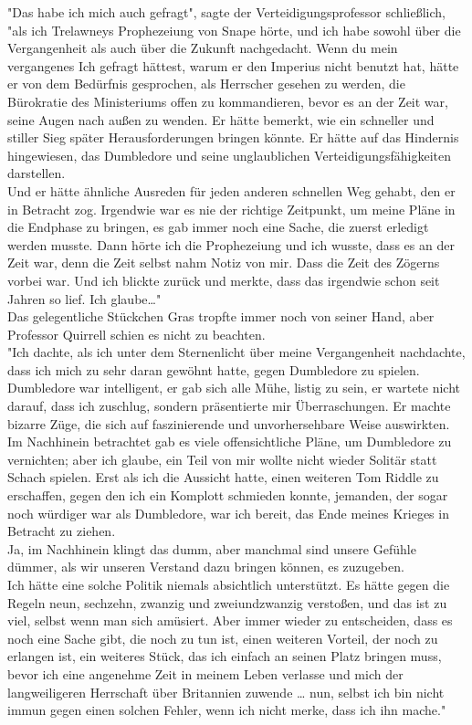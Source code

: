 {"Das habe ich mich auch gefragt", sagte der Verteidigungsprofessor schließlich, "als ich Trelawneys Prophezeiung von Snape hörte, und ich habe sowohl über die Vergangenheit als auch über die Zukunft nachgedacht. Wenn du mein vergangenes Ich gefragt hättest, warum er den Imperius nicht benutzt hat, hätte er von dem Bedürfnis gesprochen, als Herrscher gesehen zu werden, die Bürokratie des Ministeriums offen zu kommandieren, bevor es an der Zeit war, seine Augen nach außen zu wenden. Er hätte bemerkt, wie ein schneller und stiller Sieg später Herausforderungen bringen könnte. Er hätte auf das Hindernis hingewiesen, das Dumbledore und seine unglaublichen Verteidigungsfähigkeiten darstellen.\\ Und er hätte ähnliche Ausreden für jeden anderen schnellen Weg gehabt, den er in Betracht zog. Irgendwie war es nie der richtige Zeitpunkt, um meine Pläne in die Endphase zu bringen, es gab immer noch eine Sache, die zuerst erledigt werden musste. Dann hörte ich die Prophezeiung und ich wusste, dass es an der Zeit war, denn die Zeit selbst nahm Notiz von mir. Dass die Zeit des Zögerns vorbei war. Und ich blickte zurück und merkte, dass das irgendwie schon seit Jahren so lief. Ich glaube…"\\ Das gelegentliche Stückchen Gras tropfte immer noch von seiner Hand, aber Professor Quirrell schien es nicht zu beachten.\\ "Ich dachte, als ich unter dem Sternenlicht über meine Vergangenheit nachdachte, dass ich mich zu sehr daran gewöhnt hatte, gegen Dumbledore zu spielen.\\ Dumbledore war intelligent, er gab sich alle Mühe, listig zu sein, er wartete nicht darauf, dass ich zuschlug, sondern präsentierte mir Überraschungen. Er machte bizarre Züge, die sich auf faszinierende und unvorhersehbare Weise auswirkten. Im Nachhinein betrachtet gab es viele offensichtliche Pläne, um Dumbledore zu vernichten; aber ich glaube, ein Teil von mir wollte nicht wieder Solitär statt Schach spielen. Erst als ich die Aussicht hatte, einen weiteren Tom Riddle zu erschaffen, gegen den ich ein Komplott schmieden konnte, jemanden, der sogar noch würdiger war als Dumbledore, war ich bereit, das Ende meines Krieges in Betracht zu ziehen.\\ Ja, im Nachhinein klingt das dumm, aber manchmal sind unsere Gefühle dümmer, als wir unseren Verstand dazu bringen können, es zuzugeben.\\ Ich hätte eine solche Politik niemals absichtlich unterstützt. Es hätte gegen die Regeln neun, sechzehn, zwanzig und zweiundzwanzig verstoßen, und das ist zu viel, selbst wenn man sich amüsiert. Aber immer wieder zu entscheiden, dass es noch eine Sache gibt, die noch zu tun ist, einen weiteren Vorteil, der noch zu erlangen ist, ein weiteres Stück, das ich einfach an seinen Platz bringen muss, bevor ich eine angenehme Zeit in meinem Leben verlasse und mich der langweiligeren Herrschaft über Britannien zuwende … nun, selbst ich bin nicht immun gegen einen solchen Fehler, wenn ich nicht merke, dass ich ihn mache."

}
